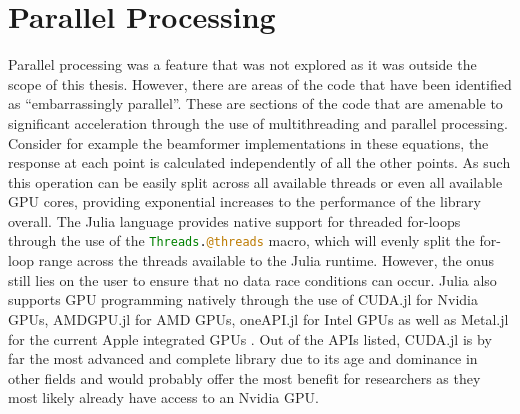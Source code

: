 \section{Parallel Processing}
Parallel processing was a feature that was not explored as it was outside the scope of this thesis. However,
there are areas of the code that have been identified as ``embarrassingly parallel''. These are sections of the code
that are amenable to significant acceleration through the use of multithreading and parallel processing. Consider for
example the beamformer implementations in these equations, the response at each point is calculated independently of all
the other points. As such this operation can be easily split across all available threads or even all available GPU
cores, providing exponential increases to the performance of the library overall. The Julia language provides native
support for threaded for-loops through the use of the \lstinline[language=Julia]{Threads.@threads} macro, which will
evenly split the for-loop range across the threads available to the Julia runtime. However, the onus still lies on the
user to ensure that no data race conditions can occur. Julia also supports GPU programming natively through the use of
CUDA.jl for Nvidia GPUs, AMDGPU.jl for AMD GPUs, oneAPI.jl for Intel GPUs as well as Metal.jl for the current Apple
integrated GPUs \cite{JuliaGPU}. Out of the APIs listed, CUDA.jl is by far the most advanced and complete library due to
its age and dominance in other fields and would probably offer the most benefit for researchers as they most likely
already have access to an Nvidia GPU.
